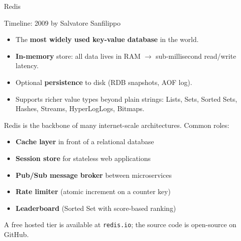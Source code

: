 \begin{frame}{Redis}
  \begin{block}{Timeline: 2009 by Salvatore Sanfilippo}
    \begin{itemize}
      \item The \textbf{most widely used key-value database} in the world.
      \item \textbf{In-memory} store: all data lives in RAM $\rightarrow$
            sub-millisecond read/write latency.
      \item Optional \textbf{persistence} to disk (RDB snapshots, AOF log).
      \item Supports richer value types beyond plain strings:
            Lists, Sets, Sorted Sets, Hashes, Streams, HyperLogLogs, Bitmaps.
    \end{itemize}
  \end{block}

  Redis is the backbone of many internet-scale architectures.  Common roles:

  \begin{itemize}
    \item \textbf{Cache layer} in front of a relational database
    \item \textbf{Session store} for stateless web applications
    \item \textbf{Pub/Sub message broker} between microservices
    \item \textbf{Rate limiter} (atomic increment on a counter key)
    \item \textbf{Leaderboard} (Sorted Set with score-based ranking)
  \end{itemize}

  A free hosted tier is available at \texttt{redis.io}; the source code is
  open-source on GitHub.
\end{frame}

